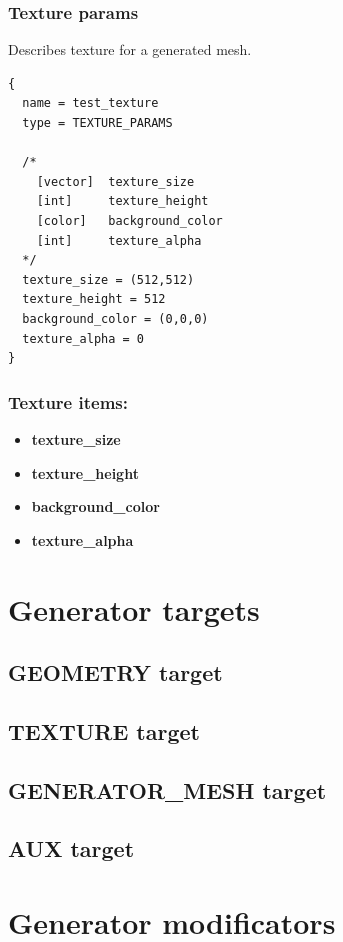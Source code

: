 \documentclass[9pt]{article}
\begin{document}
\subsubsection{Texture params}
Describes texture for a generated mesh.
\begin{verbatim}
{
  name = test_texture
  type = TEXTURE_PARAMS

  /*
    [vector]  texture_size
    [int]     texture_height
    [color]   background_color
    [int]     texture_alpha
  */
  texture_size = (512,512)  
  texture_height = 512
  background_color = (0,0,0)
  texture_alpha = 0
}
\end{verbatim}
\subsubsection*{Texture items:}
\begin{itemize}
\item{\bf texture\_size}
\item{\bf texture\_height}
\item{\bf background\_color}
\item{\bf texture\_alpha}
\end{itemize}

\section{Generator targets}
\subsection{GEOMETRY target}
\subsection{TEXTURE target}
\subsection{GENERATOR\_MESH target}
\subsection{AUX target}

\section{Generator modificators}
\end{document}
